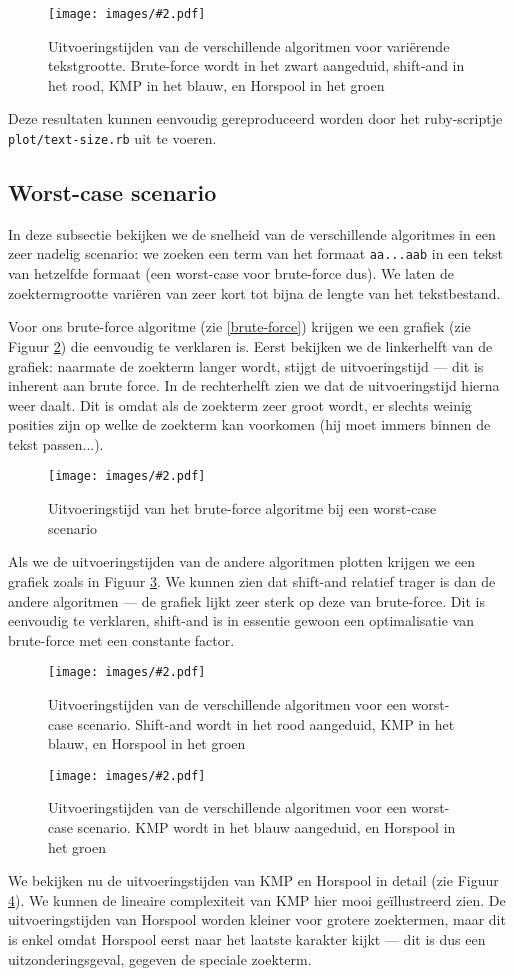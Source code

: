 \documentclass[a4paper,11pt]{article}
\newcommand{\image}[3][1]{
    \begin{figure}
    \begin{center}
    \texttt{[image: images/\#2.pdf]}
    \caption{#3}
    \label{fig:#2}
    \end{center}
    \end{figure}
}
\newcommand{\reproduce}[1]{
    Deze resultaten kunnen eenvoudig gereproduceerd worden door het
    ruby-scriptje \texttt{#1} uit te voeren.
}
\begin{document}
\image{plot-text-size}{Uitvoeringstijden van de verschillende algoritmen voor
vari\"erende tekstgrootte. Brute-force wordt in het zwart aangeduid, shift-and
in het rood, KMP in het blauw, en Horspool in het groen}

\reproduce{plot/text-size.rb}

\subsection{Worst-case scenario}

In deze subsectie bekijken we de snelheid van de verschillende algoritmes in
een zeer nadelig scenario: we zoeken een term van het formaat \verb#aa...aab#
in een tekst van hetzelfde formaat (een worst-case voor brute-force dus). We
laten de zoektermgrootte vari\"eren van zeer kort tot bijna de lengte van het
tekstbestand.

Voor ons brute-force algoritme (zie \ref{brute-force}) krijgen we een grafiek
(zie Figuur \ref{fig:plot-worst-case-brute-force}) die eenvoudig te verklaren
is. Eerst bekijken we de linkerhelft van de grafiek: naarmate de zoekterm langer
wordt, stijgt de uitvoeringstijd — dit is inherent aan brute force. In de
rechterhelft zien we dat de uitvoeringstijd hierna weer daalt. Dit is omdat
als de zoekterm zeer groot wordt, er slechts weinig posities zijn op welke de
zoekterm kan voorkomen (hij moet immers binnen de tekst passen...).

\image{plot-worst-case-brute-force}{Uitvoeringstijd van het brute-force
algoritme bij een worst-case scenario}

Als we de uitvoeringstijden van de andere algoritmen plotten krijgen we een
grafiek zoals in Figuur \ref{fig:plot-worst-case}. We kunnen zien dat shift-and
relatief trager is dan de andere algoritmen — de grafiek lijkt zeer sterk op
deze van brute-force. Dit is eenvoudig te verklaren, shift-and is in essentie
gewoon een optimalisatie van brute-force met een constante factor.

\image{plot-worst-case}{Uitvoeringstijden van de verschillende algoritmen voor
een worst-case scenario. Shift-and wordt in het rood aangeduid, KMP in het
blauw, en Horspool in het groen}

\image{plot-worst-case-detail}{Uitvoeringstijden van de verschillende algoritmen
voor een worst-case scenario. KMP wordt in het blauw aangeduid, en Horspool in
het groen}

We bekijken nu de uitvoeringstijden van KMP en Horspool in detail (zie Figuur
\ref{fig:plot-worst-case-detail}). We kunnen de lineaire complexiteit van KMP
hier mooi ge\"illustreerd zien. De uitvoeringstijden van Horspool worden kleiner
voor grotere zoektermen, maar dit is enkel omdat Horspool eerst naar het laatste
karakter kijkt — dit is dus een uitzonderingsgeval, gegeven de speciale
zoekterm.
\end{document}
